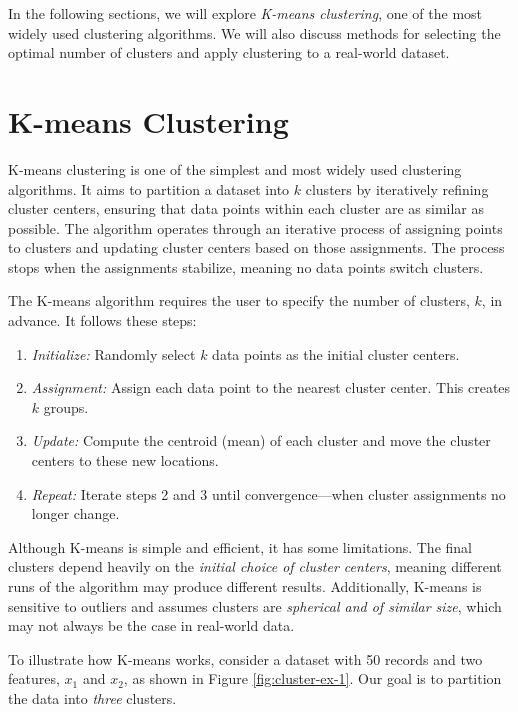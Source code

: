 \documentclass[
]{book}
\providecommand{\tightlist}{%
  \setlength{\itemsep}{0pt}\setlength{\parskip}{0pt}}
\theoremstyle{definition}
\theoremstyle{definition}
\theoremstyle{definition}
\theoremstyle{definition}
\theoremstyle{remark}
\begin{document}
In the following sections, we will explore \emph{K-means clustering}, one of the most widely used clustering algorithms. We will also discuss methods for selecting the optimal number of clusters and apply clustering to a real-world dataset.

\section{K-means Clustering}\label{kmeans}

K-means clustering is one of the simplest and most widely used clustering algorithms. It aims to partition a dataset into \emph{\(k\)} clusters by iteratively refining cluster centers, ensuring that data points within each cluster are as similar as possible. The algorithm operates through an iterative process of assigning points to clusters and updating cluster centers based on those assignments. The process stops when the assignments stabilize, meaning no data points switch clusters.

The K-means algorithm requires the user to specify the number of clusters, \emph{\(k\)}, in advance. It follows these steps:

\begin{enumerate}
\def\labelenumi{\arabic{enumi}.}
\tightlist
\item
  \emph{Initialize:} Randomly select \emph{\(k\)} data points as the initial cluster centers.\\
\item
  \emph{Assignment:} Assign each data point to the nearest cluster center. This creates \emph{\(k\)} groups.\\
\item
  \emph{Update:} Compute the centroid (mean) of each cluster and move the cluster centers to these new locations.\\
\item
  \emph{Repeat:} Iterate steps 2 and 3 until convergence---when cluster assignments no longer change.
\end{enumerate}

Although K-means is simple and efficient, it has some limitations. The final clusters depend heavily on the \emph{initial choice of cluster centers}, meaning different runs of the algorithm may produce different results. Additionally, K-means is sensitive to outliers and assumes clusters are \emph{spherical and of similar size}, which may not always be the case in real-world data.

To illustrate how K-means works, consider a dataset with 50 records and two features, \emph{\(x_1\)} and \emph{\(x_2\)}, as shown in Figure \ref{fig:cluster-ex-1}. Our goal is to partition the data into \emph{three} clusters.
\end{document}
